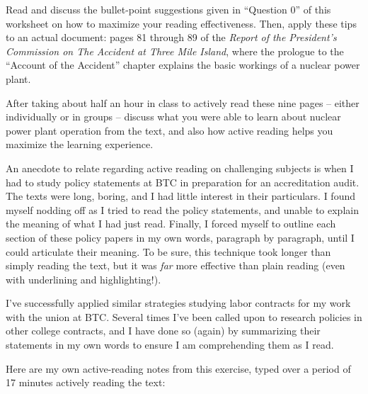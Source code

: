

Read and discuss the bullet-point suggestions given in ``Question 0'' of this worksheet on how to maximize your reading effectiveness.  Then, apply these tips to an actual document: pages 81 through 89 of the {\it Report of the President's Commission on The Accident at Three Mile Island}, where the prologue to the ``Account of the Accident'' chapter explains the basic workings of a nuclear power plant.

\vskip 10pt

After taking about half an hour in class to actively read these nine pages -- either individually or in groups -- discuss what you were able to learn about nuclear power plant operation from the text, and also how active reading helps you maximize the learning experience.







An anecdote to relate regarding active reading on challenging subjects is when I had to study policy statements at BTC in preparation for an accreditation audit.  The texts were long, boring, and I had little interest in their particulars.  I found myself nodding off as I tried to read the policy statements, and unable to explain the meaning of what I had just read.  Finally, I forced myself to outline each section of these policy papers in my own words, paragraph by paragraph, until I could articulate their meaning.  To be sure, this technique took longer than simply reading the text, but it was {\it far} more effective than plain reading (even with underlining and highlighting!).

I've successfully applied similar strategies studying labor contracts for my work with the union at BTC.  Several times I've been called upon to research policies in other college contracts, and I have done so (again) by summarizing their statements in my own words to ensure I am comprehending them as I read.







Here are my own active-reading notes from this exercise, typed over a period of 17 minutes actively reading the text:

